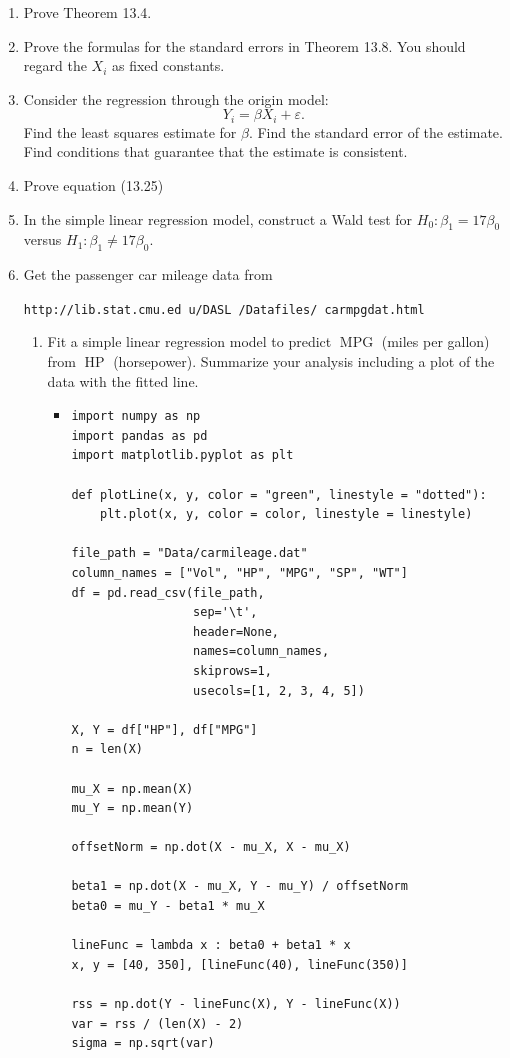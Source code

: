 \documentclass{article}
\begin{document}
\begin{enumerate}
	\item Prove Theorem 13.4.
	\item Prove the formulas for the standard errors in Theorem 13.8. You should regard the $X_i$ as fixed constants.
	\item Consider the regression through the origin model:
	$$
	Y_i = \beta X_i + \varepsilon.
	$$
	Find the least squares estimate for $\beta$. Find the standard error of the estimate. Find conditions that guarantee that the estimate is consistent.
	\item Prove equation (13.25)
	\item In the simple linear regression model, construct a Wald test for $H_0 : \beta_1 = 17\beta_0$ versus $H_1 : \beta_1 \neq 17\beta_0$.
	\item Get the passenger car mileage data from
	
	\texttt{http://lib.stat.cmu.ed u/DASL /Datafiles/ carmpgdat.html}
		\begin{enumerate}
			\item Fit a simple linear regression model to predict $\operatorname{MPG}$ (miles per gallon) from $\operatorname{HP}$ (horsepower). Summarize your analysis including a plot of the data with the fitted line.
				\begin{itemize}
				\item
				\begin{verbatim}
import numpy as np
import pandas as pd
import matplotlib.pyplot as plt

def plotLine(x, y, color = "green", linestyle = "dotted"):
    plt.plot(x, y, color = color, linestyle = linestyle)

file_path = "Data/carmileage.dat"
column_names = ["Vol", "HP", "MPG", "SP", "WT"]
df = pd.read_csv(file_path,
                 sep='\t',
                 header=None,
                 names=column_names,
                 skiprows=1,
                 usecols=[1, 2, 3, 4, 5])

X, Y = df["HP"], df["MPG"]
n = len(X)

mu_X = np.mean(X)
mu_Y = np.mean(Y)

offsetNorm = np.dot(X - mu_X, X - mu_X)

beta1 = np.dot(X - mu_X, Y - mu_Y) / offsetNorm
beta0 = mu_Y - beta1 * mu_X

lineFunc = lambda x : beta0 + beta1 * x
x, y = [40, 350], [lineFunc(40), lineFunc(350)]

rss = np.dot(Y - lineFunc(X), Y - lineFunc(X))
var = rss / (len(X) - 2)
sigma = np.sqrt(var)


\end{verbatim}
\end{itemize}
\end{enumerate}
\end{enumerate}
\end{document}
